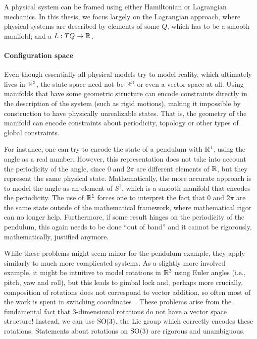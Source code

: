 A physical system can be framed using either Hamiltonian or Lagrangian mechanics. In this thesis, we focus largely on the Lagrangian approach, where physical systems are described by elements of some  $Q$, which has to be a smooth manifold; and a  $L: TQ \to {\mathbb{R}}$.

\paragraph{Configuration space}
Even though essentially all physical models try to model reality, which ultimately lives in ${\mathbb{R}}^3$, the state space need not be ${\mathbb{R}}^3$ or even a vector space at all. Using manifolds that have some geometric structure can encode constraints directly in the description of the system (such as rigid motions), making it impossible by construction to have physically unrealizable states. That is, the geometry of the manifold can encode constraints about periodicity, topology or other types of global constraints.

For instance, one can try to encode the state of a pendulum with ${\mathbb{R}}^1$, using the angle as a real number. However, this representation does not take into account the periodicity of the angle, since $0$ and $2\pi$ are different elements of ${\mathbb{R}}$, but they represent the same physical state. Mathematically, the more accurate approach is to model the angle as an element of $S^1$, which is a smooth manifold that encodes the periodicity. The use of ${\mathbb{R}}^1$ forces one to interpret the fact that $0$ and $2\pi$ are the same state outside of the mathematical framework, where mathematical rigor can no longer help. Furthermore, if some result hinges on the periodicity of the pendulum, this again needs to be done ``out of band'' and it cannot be rigorously, mathematically, justified anymore.

While these problems might seem minor for the pendulum example, they apply similarly to much more complicated systems. As a slightly more involved example, it might be intuitive to model rotations in ${\mathbb{R}}^3$ using Euler angles (i.e., pitch, yaw and roll), but this leads to gimbal lock and, perhaps more crucially, composition of rotations does not correspond to vector addition, so often most of the work is spent in switching coordinates~\cite[p. 39]{marsdenDiscreteMechanicsVariational2001}. These problems arise from the fundamental fact that 3-dimensional rotations do not have a vector space structure! Instead, we can use $\mathrm{SO}(3)$, the Lie group which correctly encodes these rotations. Statements about rotations on $\mathrm{SO}(3)$ are rigorous and unambiguous.

